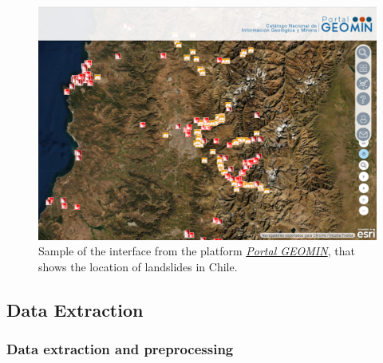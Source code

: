 \documentclass[sigconf, nonacm]{acmart}
\begin{document}
\begin{figure}
  \centering
  \includegraphics[width=\linewidth]{figures/portal geomin 2.png}
  \caption{Sample of the interface from the platform \href{https://portalgeominbeta.sernageomin.cl/}{\textit{Portal GEOMIN}}, that shows the location of landslides in Chile.} %
  \label{fig:CNNLSTM}
\end{figure}

    

\subsection{Data Extraction}


\subsubsection{Data extraction and preprocessing}
\end{document}
